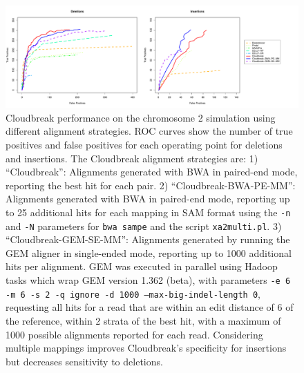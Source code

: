 \documentclass[11pt]{article}
\begin{document}
\begin{figure}
\centering
\includegraphics[width=1\textwidth]{../../figures/CHR2SIM_ROCS_MULTIPLE_MAPPINGS.pdf}
\caption{Cloudbreak performance on the chromosome 2 simulation using different alignment strategies. ROC curves show the number of true positives and false positives for each operating point for deletions and insertions. The Cloudbreak alignment strategies are: 1) ``Cloudbreak'': Alignments generated with BWA in paired-end mode, reporting the best hit for each pair. 2) ``Cloudbreak-BWA-PE-MM'': Alignments generated with BWA in paired-end mode, reporting up to 25 additional hits for each mapping in SAM format using the \texttt{-n} and \texttt{-N} parameters for \texttt{bwa sampe} and the script \texttt{xa2multi.pl}. 3) ``Cloudbreak-GEM-SE-MM'': Alignments generated by running the GEM aligner in single-ended mode, reporting up to 1000 additional hits per alignment. GEM was executed in parallel using Hadoop tasks which wrap GEM version 1.362 (beta), with parameters \texttt{-e 6 -m 6 -s 2 -q ignore -d 1000 --max-big-indel-length 0},  requesting all hits for a read that are within an edit distance of 6 of the reference, within 2 strata of the best hit, with a maximum of 1000 possible alignments reported for each read. Considering multiple mappings improves Cloudbreak's specificity for insertions but decreases sensitivity to deletions.}
\label{alignment_comparison}
\end{figure}

\clearpage
\end{document}
